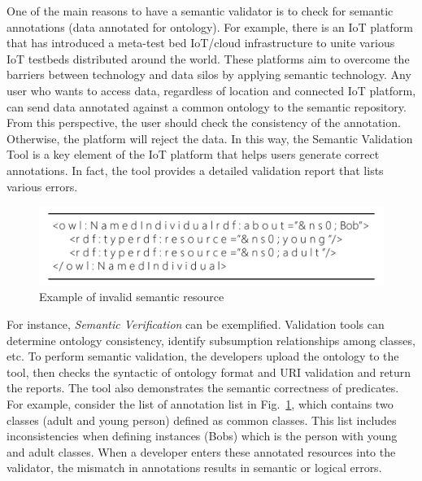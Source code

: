 One of the main reasons to have a semantic validator is to check for semantic annotations (data annotated for ontology). For example, there is an IoT platform that has introduced a meta-test bed IoT/cloud infrastructure to unite various IoT testbeds distributed around the world. These platforms aim to overcome the barriers between technology and data silos by applying semantic technology. Any user who wants to access data, regardless of location and connected IoT platform, can send data annotated against a common ontology to the semantic repository. From this perspective, the user should check the consistency of the annotation. Otherwise, the platform will reject the data. In this way, the Semantic Validation Tool is a key element of the IoT platform that helps users generate correct annotations. In fact, the tool provides a detailed validation report that lists various errors.

\begin{figure}[H]			%
	\centering
	\includegraphics[width=\textwidth]{figures/fig_smantic_validation_example.pdf}
    \caption{Example of invalid semantic resource}
    \label{fig:example_of_invalid_semantic_resource}
\end{figure}

For instance, \textit{Semantic Verification} can be exemplified. Validation tools can determine ontology consistency, identify subsumption relationships among classes, etc. To perform semantic validation, the developers upload the ontology to the tool, then checks the syntactic of ontology format and URI validation and return the reports. The tool also demonstrates the semantic correctness of predicates. For example, consider the list of annotation list in Fig.~\ref{fig:example_of_invalid_semantic_resource}, which contains two classes (adult and young person) defined as common classes. This list includes inconsistencies when defining instances (Bobs) which is the person with young and adult classes. When a developer enters these annotated resources into the validator, the mismatch in annotations results in semantic or logical errors.

